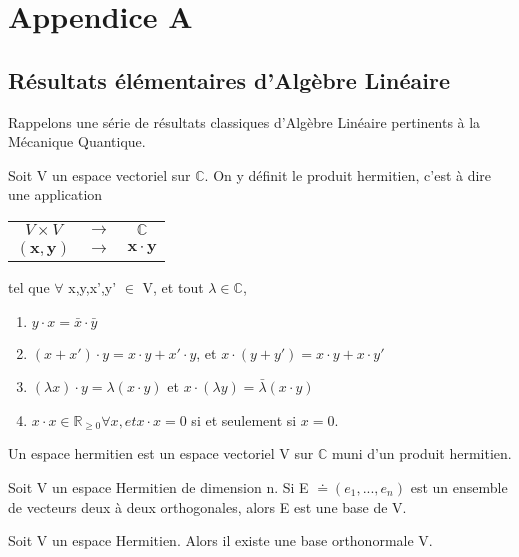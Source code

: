\documentclass[../notesdecours.tex]{subfiles}
\begin{document}
\appendix
\chapter{Appendice A}
\section{Résultats élémentaires d'Algèbre Linéaire}
\label{AppendeiceA}
Rappelons une série de résultats classiques d'Algèbre Linéaire pertinents à la Mécanique Quantique.\\

\begin{definition} Soit V un espace vectoriel sur $\mathbb{C}$. On y définit le produit hermitien, c'est à dire une application
\begin{center}
\begin{tabular}{c c c}
$V \times V$ & $\rightarrow$ & $\mathbb{C}$\\
$\left(\bm{x},\bm{y}\right)$ &  $\rightarrow$ & $\bm{x} \cdot \bm{y}$
\end{tabular}
\end{center}
tel que $\forall$ x,y,x',y' $\in$ V, et tout $\lambda \in \mathbb{C}$,
\begin{enumerate}
\item $y\cdot x = \bar{x} \cdot \bar{y}$
\item $\left( x+x' \right) \cdot y = x \cdot y + x' \cdot y$, et $x\cdot(y+y') = x\cdot y+x\cdot y'$
\item $\left( \lambda x \right)\cdot y = \lambda \left(x\cdot y\right)$ et $x\cdot (\lambda y) = \bar{\lambda} (x\cdot y)$
\item $x \cdot x \in \mathbb{R}_{\geq 0} \forall x, et x \cdot x = 0$ si et seulement si $x = 0$.
\end{enumerate}
Un espace hermitien est un espace vectoriel V sur $\mathbb{C}$ muni d'un produit hermitien.
\end{definition}

\begin{Property}
Soit V un espace Hermitien de dimension n. Si E $\doteq \left(e_1,...,e_n\right)$ est un ensemble de vecteurs deux à deux orthogonales, alors E est une base de V. 
\end{Property}


\begin{Property} Soit V un espace Hermitien. Alors il existe une base orthonormale V. \end{Property}
\end{document}
